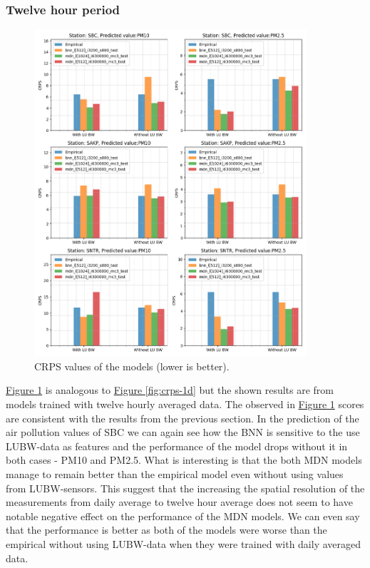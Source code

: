 \documentclass[12pt,a4paper,twoside]{scrartcl}
\numberwithin{equation}{section}
\newcommand{\reffig}[1]{\hyperref[#1]{Figure \ref*{#1}}}
\begin{document}
\subsubsection{Twelve hour period}\label{sec:res-12h}
\begin{center}
  \begin{figure}[H] \centering \includegraphics[height=0.9\textwidth,
    width=0.9\textwidth]{figures/figs_12h/results_plot_CRPS}
    \caption[CRPS results (twelve hourly average)]{CRPS values of the models
      (lower is better).}\label{fig:crps-12h}
  \end{figure}
\end{center}

\reffig{fig:crps-12h} is analogous to \reffig{fig:crps-1d} but the shown results are from models trained with twelve hourly averaged data. The observed in \reffig{fig:crps-12h} scores are consistent with the results from the previous section. In the prediction of the air pollution values of SBC we can again see how the BNN is sensitive to the use LUBW-data as features and the performance of the model drops without it in both cases - PM10 and PM2.5. What is interesting is that the both MDN models manage to remain better than the empirical model even without using values from LUBW-sensors. This suggest that the increasing the spatial resolution of the measurements from daily average to twelve hour average does not seem to have notable negative effect on the performance of the MDN models. We can even say that the performance is better as both of the models were worse than the empirical without using LUBW-data when they were trained with daily averaged data.
\end{document}
